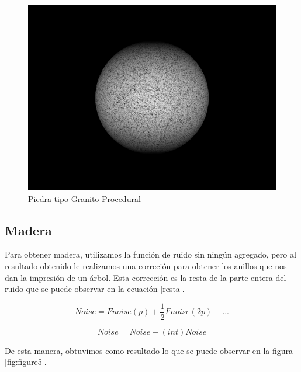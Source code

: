 \documentclass[a4paper,10pt]{article}
\begin{document}
\begin{figure}[h!]
 \centering
 \includegraphics[scale=0.5]{./proceduralStone.png}
 \caption{Piedra tipo Granito Procedural}
 \label{fig:figure4}
\end{figure}

\subsection{Madera}

Para obtener madera, utilizamos la función de ruido sin ningún agregado, pero
al resultado obtenido le realizamos una correción para obtener los anillos que
nos dan la impresión de un árbol.  Esta corrección es la resta de la parte
entera del ruido que se puede observar en la ecuación \ref{resta}.


\begin{equation}
 Noise = Fnoise(p) + \frac{1}{2} Fnoise(2p) + ...
\end{equation}

\begin{equation}
\label{resta}
 Noise = Noise - (int) Noise
\end{equation}

De esta manera, obtuvimos como resultado lo que se puede observar en la figura
\ref{fig:figure5}.
\end{document}
